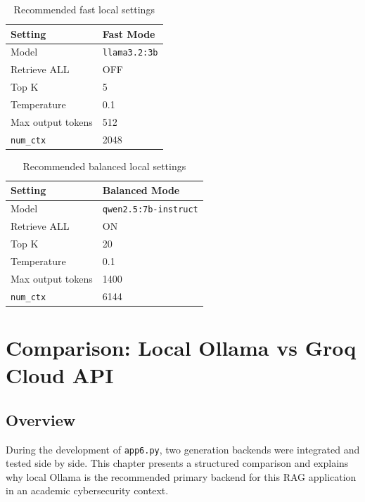 \documentclass[12pt,a4paper]{report}
\begin{document}
\begin{table}[H]
\centering
\begin{tabular}{ll}
\toprule
\textbf{Setting} & \textbf{Fast Mode} \\
\midrule
Model & \texttt{llama3.2:3b} \\
Retrieve ALL & OFF \\
Top K & 5 \\
Temperature & 0.1 \\
Max output tokens & 512 \\
\texttt{num\_ctx} & 2048 \\
\bottomrule
\end{tabular}
\caption{Recommended fast local settings}
\end{table}

\begin{table}[H]
\centering
\begin{tabular}{ll}
\toprule
\textbf{Setting} & \textbf{Balanced Mode} \\
\midrule
Model & \texttt{qwen2.5:7b-instruct} \\
Retrieve ALL & ON \\
Top K & 20 \\
Temperature & 0.1 \\
Max output tokens & 1400 \\
\texttt{num\_ctx} & 6144 \\
\bottomrule
\end{tabular}
\caption{Recommended balanced local settings}
\end{table}


\chapter{Comparison: Local Ollama vs Groq Cloud API}

\section{Overview}

During the development of \texttt{app6.py}, two generation backends were integrated and tested side by side. This chapter presents a structured comparison and explains why local Ollama is the recommended primary backend for this RAG application in an academic cybersecurity context.
\end{document}
